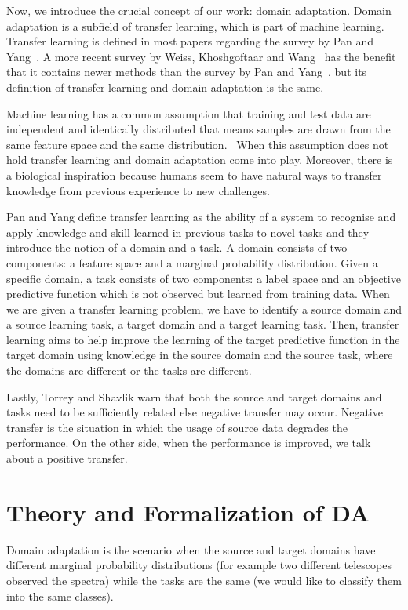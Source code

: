 \documentclass[thesis=M,english]{FITthesis}[2012/10/20]
\begin{document}
Now, we introduce the crucial concept of our work: domain adaptation.
Domain adaptation is a subfield of transfer learning,
which is part of machine learning.
Transfer learning is defined in most papers regarding the survey by Pan and Yang~\cite{pan2010}.
A more recent survey by Weiss, Khoshgoftaar and Wang~\cite{weiss2016} has the benefit
that it contains newer methods than the survey by Pan and Yang~\cite{pan2010},
but its definition of transfer learning and domain adaptation is the same.

Machine learning has a common assumption that training and test data are independent and identically distributed
that means samples are drawn from the same feature space and the same distribution.~\cite{daume2006}
When this assumption does not hold transfer learning and domain adaptation come into play.
Moreover, there is a biological inspiration
because humans seem to have natural ways to transfer knowledge from previous experience to new challenges.~\cite{torrey2010}

Pan and Yang define transfer learning as the ability of a system to recognise and apply knowledge and skill learned in previous tasks to novel tasks
and they introduce the notion of a domain and a task.
A domain consists of two components: a feature space and a marginal probability distribution.
Given a specific domain, a task consists of two components: a label space and an objective predictive function
which is not observed but learned from training data.
When we are given a transfer learning problem,
we have to identify a source domain and a source learning task,
a target domain and a target learning task.
Then, transfer learning aims to help improve the learning of the target predictive function in the target domain using knowledge in the source domain and the source task,
where the domains are different or the tasks are different.~\cite{pan2010}

Lastly, Torrey and Shavlik warn that both the source and target domains and tasks need to be sufficiently related
else negative transfer may occur.
Negative transfer is the situation in which the usage of source data degrades the performance.
On the other side, when the performance is improved,
we talk about a positive transfer.~\cite{torrey2010}

\section{Theory and Formalization of DA}

Domain adaptation is the scenario when the source and target domains have different marginal probability distributions
(for example two different telescopes observed the spectra)
while the tasks are the same
(we would like to classify them into the same classes).
\end{document}
